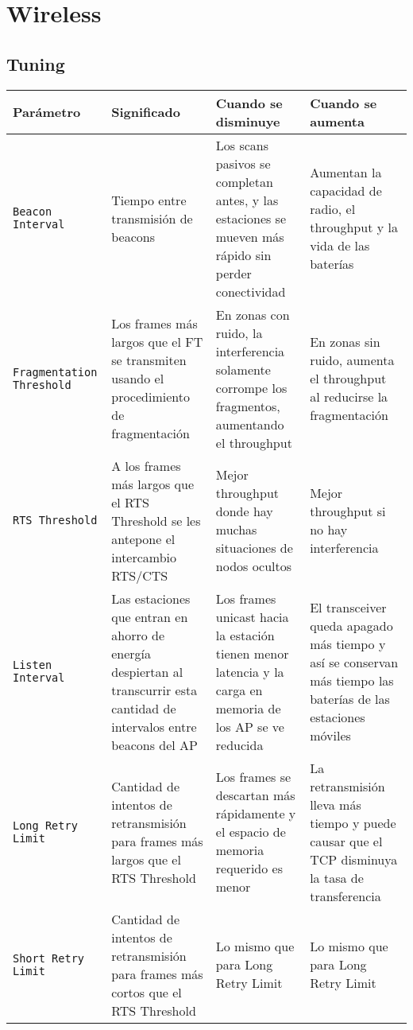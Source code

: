 \section {Wireless}

\subsection {Tuning}

\parindent=0pt
\hrulefill
\begin{tabular}{   p{} |
                   p{} |
                   p{} |
                   p{}  }

Parámetro 	& Significado  & Cuando se disminuye & Cuando se aumenta \\
\hline
\texttt{Beacon Interval}&Tiempo entre transmisión de beacons&Los scans pasivos se completan antes, y las estaciones se mueven más rápido sin perder conectividad
& Aumentan la capacidad de radio, el throughput y la vida de las baterías\\
\hline
\texttt{Fragmentation Threshold}&Los frames más largos que el FT se transmiten usando el procedimiento de fragmentación&En zonas con ruido, la interferencia solamente corrompe los fragmentos, aumentando el throughput&En zonas sin ruido, aumenta el throughput al reducirse la fragmentación \\
\hline
\texttt{RTS Threshold}&A los frames más largos que el RTS Threshold se les antepone el intercambio RTS/CTS&Mejor throughput donde hay muchas situaciones de nodos ocultos&Mejor throughput si no hay interferencia\\
\hline
\texttt{Listen Interval}&Las estaciones que entran en ahorro de energía despiertan al transcurrir esta cantidad de intervalos entre beacons del AP&Los frames unicast hacia la estación tienen menor latencia y la carga en memoria de los AP se ve reducida&El transceiver queda apagado más tiempo y así se conservan más tiempo las baterías de las estaciones móviles\\
\hline
\texttt{Long Retry Limit}&Cantidad de intentos de retransmisión para frames más largos que el RTS Threshold&Los frames se descartan más rápidamente y el espacio de memoria requerido es menor&La retransmisión lleva más tiempo y puede causar que el TCP disminuya la tasa de transferencia \\
\hline
\texttt{Short Retry Limit}&Cantidad de intentos de retransmisión para frames más cortos que el RTS Threshold&Lo mismo que para Long Retry Limit&Lo mismo que para Long Retry Limit \\
\hline
\end{tabular}
